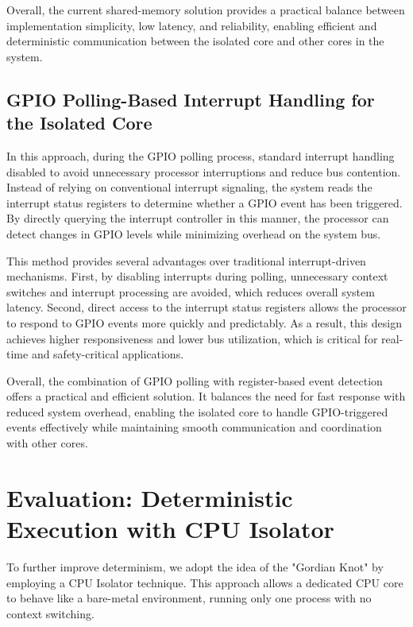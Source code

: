 \documentclass[letterpaper]{article}
\begin{document}
Overall, the current shared-memory solution provides a practical balance between implementation
simplicity, low latency, and reliability, enabling efficient and deterministic communication
between the isolated core and other cores in the system.

\subsection{GPIO Polling-Based Interrupt Handling for the Isolated Core}

In this approach, during the GPIO polling process, standard interrupt handling disabled to
avoid unnecessary processor interruptions and reduce bus contention. Instead of relying on
conventional interrupt signaling, the system reads the interrupt status registers to determine
whether a GPIO event has been triggered. By directly querying the interrupt controller in this
manner, the processor can detect changes in GPIO levels while minimizing overhead on the system bus.

This method provides several advantages over traditional interrupt-driven mechanisms. First,
by disabling interrupts during polling, unnecessary context switches and interrupt processing
are avoided, which reduces overall system latency. Second, direct access to the interrupt status
registers allows the processor to respond to GPIO events more quickly and predictably. As a result,
this design achieves higher responsiveness and lower bus utilization, which is critical for
real-time and safety-critical applications.

Overall, the combination of GPIO polling with register-based event detection offers a practical
and efficient solution. It balances the need for fast response with reduced system overhead,
enabling the isolated core to handle GPIO-triggered events effectively while maintaining smooth
communication and coordination with other cores.


\section{Evaluation: Deterministic Execution with CPU Isolator}

To further improve determinism, we adopt the idea of the "Gordian Knot" by employing a CPU
Isolator technique. This approach allows a dedicated CPU core to behave like a bare-metal
environment, running only one process with no context switching.
\end{document}
